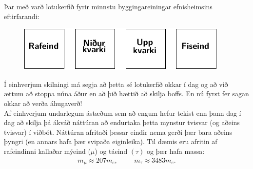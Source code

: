 \begin{figure}[H]
    \centering
    \qquad
\end{figure}


Þar með varð lotukerfið fyrir minnstu byggingareiningar efnisheimsins eftirfarandi:

\begin{figure}[H]
    \centering
    \includegraphics[width=.5\textwidth]{figures/lotukerfi4.pdf}
\end{figure}

Í einhverjum skilningi má segja að þetta sé lotukerfið okkar í dag og að við ættum að stoppa núna áður en að þið hættið að skilja boffs. En nú fyrst fer sagan okkar að verða áhugaverð! \\

Af einhverjum undarlegum ástæðum sem að engum hefur tekist enn þann dag í dag að skilja þá ákváð náttúran að endurtaka þetta mynstur tvisvar (og aðeins tvisvar) í viðbót. Náttúran afritaði þessar eindir nema gerði þær bara aðeins þyngri (en annars hafa þær svipaða eiginleika). Til dæmis eru afritin af rafeindinni kallaðar mýeind ($\mu$) og táeind $(\tau)$ og þær hafa massa:
\begin{align*}
    m_{\mu} \approx 207 m_e, \hspace{1cm} m_\tau \approx 3483 m_e.
\end{align*}

